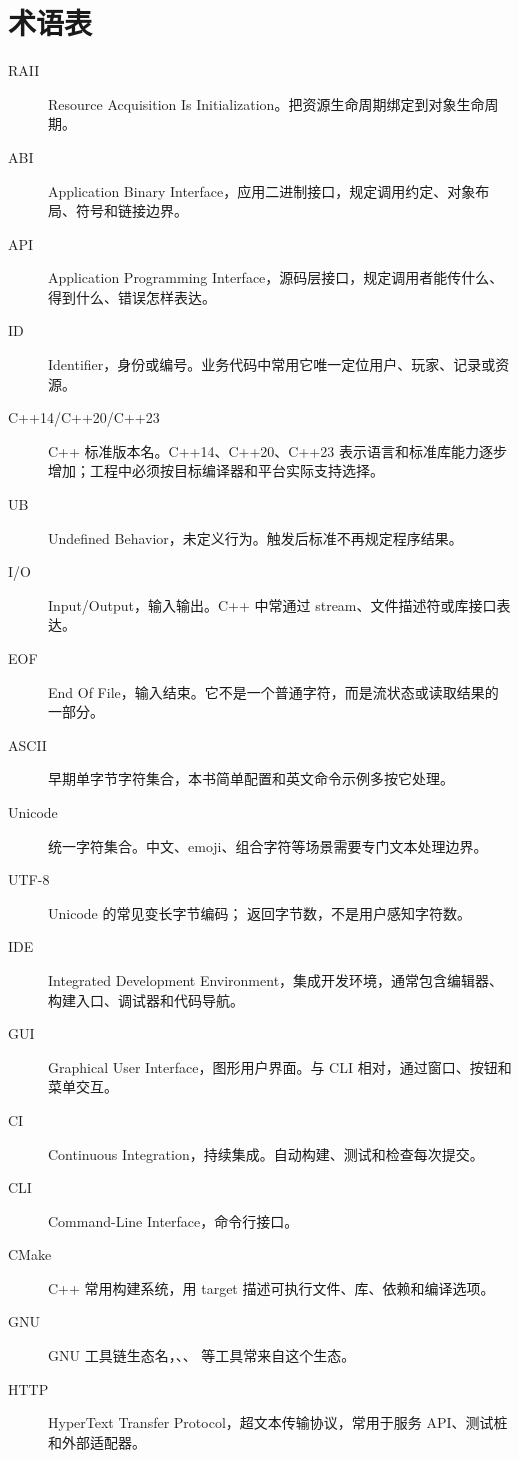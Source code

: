 \chapter*{术语表}

\begin{description}
  \item[RAII] Resource Acquisition Is Initialization。把资源生命周期绑定到对象生命周期。
  \item[ABI] Application Binary Interface，应用二进制接口，规定调用约定、对象布局、符号和链接边界。
  \item[API] Application Programming Interface，源码层接口，规定调用者能传什么、得到什么、错误怎样表达。
  \item[ID] Identifier，身份或编号。业务代码中常用它唯一定位用户、玩家、记录或资源。
  \item[C++14/C++20/C++23] C++ 标准版本名。C++14、C++20、C++23 表示语言和标准库能力逐步增加；工程中必须按目标编译器和平台实际支持选择。
  \item[UB] Undefined Behavior，未定义行为。触发后标准不再规定程序结果。
  \item[I/O] Input/Output，输入输出。C++ 中常通过 stream、文件描述符或库接口表达。
  \item[EOF] End Of File，输入结束。它不是一个普通字符，而是流状态或读取结果的一部分。
  \item[ASCII] 早期单字节字符集合，本书简单配置和英文命令示例多按它处理。
  \item[Unicode] 统一字符集合。中文、emoji、组合字符等场景需要专门文本处理边界。
  \item[UTF-8] Unicode 的常见变长字节编码； 返回字节数，不是用户感知字符数。
  \item[IDE] Integrated Development Environment，集成开发环境，通常包含编辑器、构建入口、调试器和代码导航。
  \item[GUI] Graphical User Interface，图形用户界面。与 CLI 相对，通过窗口、按钮和菜单交互。
  \item[CI] Continuous Integration，持续集成。自动构建、测试和检查每次提交。
  \item[CLI] Command-Line Interface，命令行接口。
  \item[CMake] C++ 常用构建系统，用 target 描述可执行文件、库、依赖和编译选项。
  \item[GNU] GNU 工具链生态名，、、 等工具常来自这个生态。
  \item[HTTP] HyperText Transfer Protocol，超文本传输协议，常用于服务 API、测试桩和外部适配器。

\end{description}
